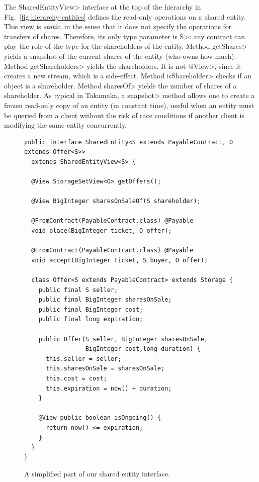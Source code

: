 The \<SharedEntityView> interface at the top of the hierarchy in Fig.~\ref{fig:hierarchy-entities}
defines the read-only operations on a shared entity. This view is \emph{static}, in the sense that it
does not specify the operations for transfers of shares. Therefore, its only type parameter is \<S>:
any contract can play the role of the type for the shareholders of the entity.
Method \<getShares> yields a snapshot of the
current shares of the entity (who owns how much). Method \<getShareholders> yields the shareholders.
It is not \<@View>, since it creates a new stream, which is a side-effect.
Method \<isShareholder> checks if an object is a shareholder. Method \<sharesOf> yields
the number of shares of a shareholder. As typical in Takamaka, a \<snapshot> method allows one
to create a frozen read-only copy of an entity (in constant time), useful when an entity must be queried from
a client without the risk of race conditions if another client is modifying the same entity concurrently.


\begin{figure}[ht]
  \begin{center}
    \begin{lstlisting}[language=Takamaka]
public interface SharedEntity<S extends PayableContract, O extends Offer<S>>
  extends SharedEntityView<S> {

  @View StorageSetView<O> getOffers();

  @View BigInteger sharesOnSaleOf(S shareholder);

  @FromContract(PayableContract.class) @Payable
  void place(BigInteger ticket, O offer);

  @FromContract(PayableContract.class) @Payable
  void accept(BigInteger ticket, S buyer, O offer);

  class Offer<S extends PayableContract> extends Storage {
    public final S seller;
    public final BigInteger sharesOnSale;
    public final BigInteger cost;
    public final long expiration;

    public Offer(S seller, BigInteger sharesOnSale, 
                 BigInteger cost,long duration) {
      this.seller = seller;
      this.sharesOnSale = sharesOnSale;
      this.cost = cost;
      this.expiration = now() + duration;
    }

    @View public boolean isOngoing() {
      return now() <= expiration;
    }
  }
}
    \end{lstlisting}
  \end{center}
  \caption{A simplified part of our shared entity interface.}\label{fig:shared_entity}
\end{figure}

